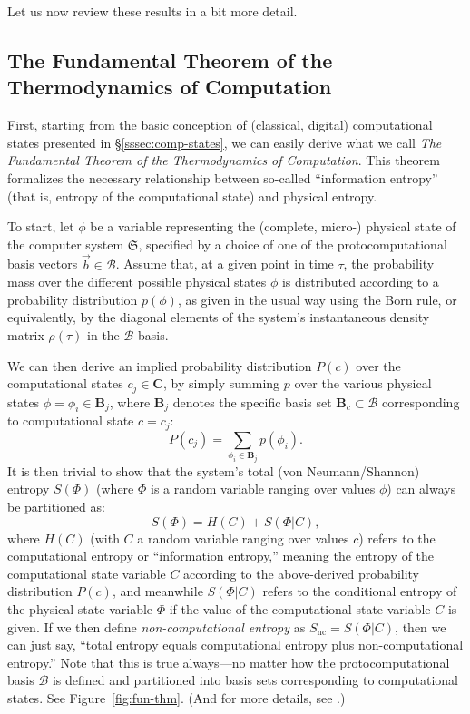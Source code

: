 \documentclass[preprints,article,accept,moreauthors,pdftex]{Definitions/mdpi}
\begin{document}
\begin{paracol}{2}
Let us now review these results in a bit more detail.

\subsection{The Fundamental Theorem of the Thermodynamics of Computation}
\label{ssec:fun-thm}

First, starting from the basic conception of (classical, digital) computational states presented in \S\ref{sssec:comp-states}, we can easily derive what we call \emph{The Fundamental Theorem of the Thermodynamics of Computation}. This theorem formalizes the necessary relationship between so-called ``information entropy'' (that is, entropy of the computational state) and physical entropy.

To start, let $\phi$ be a variable representing the (complete, micro-) physical state of the computer system $\mathfrak{S}$, specified by a choice of one of the protocomputational basis vectors $\vec{b}\in\boldsymbol{\mathcal{B}}$. Assume that, at a given point in time $\tau$, the probability mass over the different possible physical states $\phi$ is distributed according to a probability distribution $p(\phi)$, as given in the usual way using the Born rule, or equivalently, by the diagonal elements of the system's instantaneous density matrix $\rho(\tau)$ in the $\boldsymbol{\mathcal{B}}$ basis.

We can then derive an implied probability distribution $P(c)$ over the computational states $c_j\in\boldsymbol{C}$, by simply summing $p$ over the various physical states $\phi=\phi_i\in\boldsymbol{B}_j$, where $\boldsymbol{B}_j$ denotes the specific basis set $\boldsymbol{B}_c\subset\boldsymbol{\mathcal{B}}$ corresponding to computational state $c=c_j$:
\begin{equation}
    \label{eq-28}
    P(c_j)=\sum_{\phi_i\in\boldsymbol{B}_j} p(\phi_i).
\end{equation}
It is then trivial to show that the system's total (von Neumann/Shannon) entropy $S(\Phi)$ (where $\Phi$ is a random variable ranging over values $\phi$) can always be partitioned as:
\begin{equation}
    \label{eq-29}
    S(\Phi) = H(C)+S(\Phi | C),
\end{equation}
where $H(C)$ (with $C$ a random variable ranging over values $c$) refers to the computational entropy or ``information entropy,'' meaning the entropy of the computational state variable $C$ according to the above-derived probability distribution $P(c)$, and meanwhile $S(\Phi|C)$ refers to the conditional entropy of the physical state variable $\Phi$ if the value of the computational state variable $C$ is given. If we then define \emph{non-computational entropy} as $S_\mathrm{nc} = S(\Phi|C)$, then we can just say, ``total entropy equals computational entropy plus non-computational entropy.'' Note that this is true always---no matter how the protocomputational basis $\boldsymbol{\mathcal{B}}$ is defined and partitioned into basis sets corresponding to computational states. See Figure~\ref{fig:fun-thm}. (And for more details, see \cite{Fra18}.)


\end{paracol}
\end{document}
